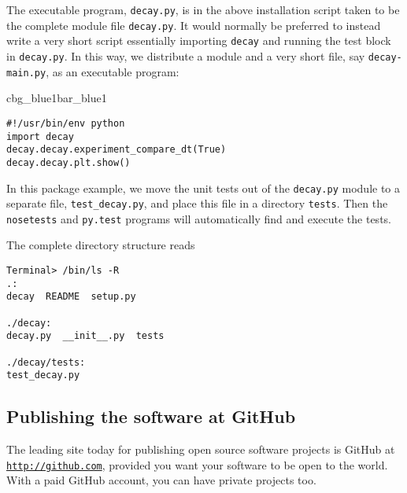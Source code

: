 \documentclass[graybox,sectrefs,envcountresetchap,open=right,final]{svmonodo}
\newenvironment{_pro_tight}[2]{
   \def\FrameCommand{\color{#2}\vrule width 1mm\normalcolor\colorbox{#1}}
   \FrameRule0.6pt\MakeFramed {\advance\hsize-2mm\FrameRestore}\vskip3mm}
   {\vskip0mm\endMakeFramed}
\newenvironment{pro}[2]{
\bgroup\rmfamily
\fboxsep=0mm\relax
\begin{_pro_tight}{#1}{#2}
\list{}{\parsep=-2mm\parskip=0mm\topsep=0pt\leftmargin=2mm
\rightmargin=2\leftmargin\leftmargin=4pt\relax}
\item\relax}
{\endlist\end{_pro_tight}\egroup}
\newenvironment{notice_mdfboxadmon}[1][]{
\begin{notice_mdfboxmdframed}[frametitle=#1]
}
{
\end{notice_mdfboxmdframed}
}
\begin{document}


\begin{notice_mdfboxadmon}
The executable program, \texttt{decay.py}, is in the above installation
script taken to be the complete
module file \texttt{decay.py}. It would normally be preferred to instead
write a very short script essentially importing \texttt{decay} and running
the test block in \texttt{decay.py}.  In this way, we distribute a module and
a very short file, say \texttt{decay-main.py}, as an executable program:

\begin{pro}{cbg_blue1}{bar_blue1}\begin{Verbatim}[numbers=none,fontsize=\fontsize{9pt}{9pt},baselinestretch=0.95,xleftmargin=2mm]
#!/usr/bin/env python
import decay
decay.decay.experiment_compare_dt(True)
decay.decay.plt.show()
\end{Verbatim}
\end{pro}
\noindent
\end{notice_mdfboxadmon}



In this package example, we move the unit tests out of the \texttt{decay.py}
module to a separate file, \Verb!test_decay.py!, and place this file in a
directory \texttt{tests}. Then the \texttt{nosetests} and \texttt{py.test} programs will
automatically find and execute the tests.

The complete directory structure reads

\begin{Verbatim}[frame=lines,label=\fbox{{\tiny Terminal}},framesep=2.5mm,framerule=0.7pt,fontsize=\fontsize{9pt}{9pt}]
Terminal> /bin/ls -R
.:
decay  README  setup.py

./decay:
decay.py  __init__.py  tests

./decay/tests:
test_decay.py
\end{Verbatim}

\subsection{Publishing the software at GitHub}


The leading site today for publishing open source software projects is
GitHub at \href{{http://github.com}}{\nolinkurl{http://github.com}}, provided you want your software to
be open to the world. With a paid GitHub account, you can have private
projects too.
\end{document}
